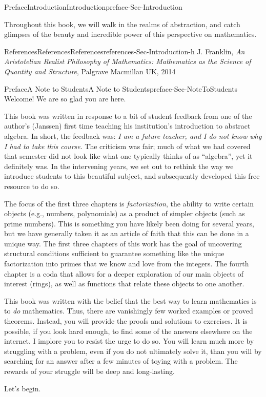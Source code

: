 \documentclass[oneside,10pt,]{book}
\numberwithin{equation}{section}
\begin{document}
\begin{preface}{Preface}{Introduction}{}{Introduction}{}{}{preface-Sec-Introduction}
\par
Throughout this book, we will walk in the realms of abstraction, and catch glimpses of the beauty and incredible power of this perspective on mathematics.%
%
%
\typeout{************************************************}
\typeout{************************************************}
%
\begin{references-}{References}{References}{}{References}{}{}{references-Sec-Introduction-h}
J. Franklin, \emph{An Aristotelian Realist Philosophy of Mathematics: Mathematics as the Science of Quantity and Structure}, Palgrave Macmillan UK, 2014\end{references-}
\end{preface}
%
%
\typeout{************************************************}
\typeout{************************************************}
%
\begin{preface}{Preface}{A Note to Students}{}{A Note to Students}{}{}{preface-Sec-NoteToStudents}
Welcome! We are so glad you are here.%
\par
This book was written in response to a bit of student feedback from one of the author's (Janssen) first time teaching his institution's introduction to abstract algebra. In short, the feedback was: \emph{I am a future teacher, and I do not know why I had to take this course}. The criticism was fair; much of what we had covered that semester did not look like what one typically thinks of as ``algebra'', yet it definitely was. In the intervening years, we set out to rethink the way we introduce students to this beautiful subject, and subsequently developed this free resource to do so.%
\par
The focus of the first three chapters is \emph{factorization}, the ability to write certain objects (e.g., numbers, polynomials) as a product of simpler objects (such as prime numbers). This is something you have likely been doing for several years, but we have generally taken it as an article of faith that this can be done in a unique way. The first three chapters of this work has the goal of uncovering structural conditions sufficient to guarantee something like the unique factorization into primes that we know and love from the integers. The fourth chapter is a coda that allows for a deeper exploration of our main objects of interest (rings), as well as functions that relate these objects to one another.%
\par
This book was written with the belief that the best way to learn mathematics is to \emph{do} mathematics. Thus, there are vanishingly few worked examples or proved theorems. Instead, you will provide the proofs and solutions to exercises. It is possible, if you look hard enough, to find some of the answers elsewhere on the internet. I implore you to resist the urge to do so. You will learn much more by struggling with a problem, even if you do not ultimately solve it, than you will by searching for an answer after a few minutes of toying with a problem. The rewards of your struggle will be deep and long-lasting.%
\par
Let's begin.%
\end{preface}
\end{document}
